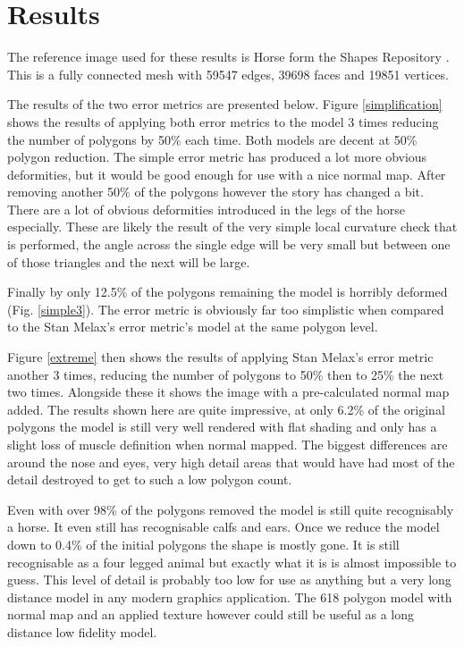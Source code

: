 \chapter{Results}

  The reference image used for these results is Horse form the Shapes Repository
  \cite{horse}.  This is a fully connected mesh with 59547 edges, 39698 faces
  and 19851 vertices.

  The results of the two error metrics are presented below.  Figure
  \ref{simplification} shows the results of applying both error metrics to the
  model 3 times reducing the number of polygons by 50\% each time.  Both models
  are decent at 50\% polygon reduction. The simple error metric has produced a
  lot more obvious deformities, but it would be good enough for use with a nice
  normal map.  After removing another 50\% of the polygons however the story has
  changed a bit.  There are a lot of obvious deformities introduced in the legs
  of the horse especially.  These are likely the result of the very simple
  local curvature check that is performed, the angle across the single edge will
  be very small but between one of those triangles and the next will be large.

  Finally by only 12.5\% of the polygons remaining the model is horribly
  deformed (Fig. \ref{simple3}).  The error metric is obviously far too
  simplistic when compared to the Stan Melax's error metric's model at the same
  polygon level.

  Figure \ref{extreme} then shows the results of applying Stan Melax's error
  metric another 3 times, reducing the number of polygons to 50\% then to 25\%
  the next two times.  Alongside these it shows the image with a pre-calculated
  normal map added. The results shown here are quite impressive, at only 6.2\%
  of the original polygons the model is still very well rendered with flat
  shading and only has a slight loss of muscle definition when normal mapped.
  The biggest differences are around the nose and eyes, very high detail areas
  that would have had most of the detail destroyed to get to such a low polygon
  count.

  Even with over 98\% of the polygons removed the model is still quite
  recognisably a horse.  It even still has recognisable calfs and ears.  Once we
  reduce the model down to 0.4\% of the initial polygons the shape is mostly
  gone.  It is still recognisable as a four legged animal but exactly what it is
  is almost impossible to guess.  This level of detail is probably too low for
  use as anything but a very long distance model in any modern graphics
  application.  The 618 polygon model with normal map and an applied texture
  however could still be useful as a long distance low fidelity model.


